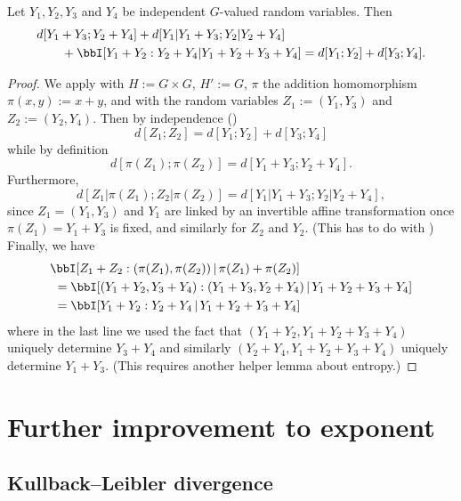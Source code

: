 \begin{corollary}\label{cor-fibre}
  \leanok
  Let $Y_1,Y_2,Y_3$ and $Y_4$ be independent $G$-valued random variables.
  Then
\begin{align*}
  & d[Y_1+Y_3; Y_2+Y_4] + d[Y_1|Y_1+Y_3; Y_2|Y_2+Y_4] \\
  &\qquad + \bbI[Y_1+Y_2 : Y_2 + Y_4 | Y_1+Y_2+Y_3+Y_4] = d[Y_1; Y_2] + d[Y_3; Y_4].
\end{align*}
\end{corollary}

\begin{proof}
  \leanok
  We apply  with $H := G \times G$, $H' := G$, $\pi$ the addition homomorphism $\pi(x,y) := x+y$, and with the random variables $Z_1 := (Y_1,Y_3)$ and $Z_2 := (Y_2,Y_4)$.  Then by independence ()
\[
  d[Z_1; Z_2] = d[Y_1; Y_2] + d[Y_3; Y_4]
\]
while by definition
\[
  d[\pi(Z_1); \pi(Z_2)] = d[Y_1+Y_3; Y_2+Y_4].
\]
Furthermore,
\[
  d[Z_1|\pi(Z_1); Z_2|\pi(Z_2)] = d[Y_1|Y_1+Y_3;Y_2|Y_2+Y_4],
\]
since $Z_1=(Y_1,Y_3)$ and $Y_1$ are linked by an invertible affine transformation once $\pi(Z_1)=Y_1+Y_3$ is fixed, and similarly for $Z_2$ and $Y_2$.  (This has to do with )
Finally, we have
\begin{align*}
  &\bbI[Z_1 + Z_2 : (\pi(Z_1),\pi(Z_2)) \,|\, \pi(Z_1) + \pi(Z_2)] \\
  &\ = \bbI[(Y_1+Y_2, Y_3+Y_4) : (Y_1+Y_3, Y_2+Y_4) \,|\, Y_1+Y_2+Y_3+Y_4] \\
  &\ = \bbI[Y_1+Y_2 : Y_2+Y_4 \,|\, Y_1+Y_2+Y_3+Y_4]
\end{align*}
where in the last line we used the fact that $(Y_1+Y_2, Y_1+Y_2+Y_3+Y_4)$ uniquely determine $Y_3+Y_4$ and similarly
$(Y_2+Y_4, Y_1+Y_2+Y_3+Y_4)$ uniquely determine $Y_1+Y_3$.  (This requires another helper lemma about entropy.)
\end{proof}


\chapter{Further improvement to exponent}

\section{Kullback--Leibler divergence}

